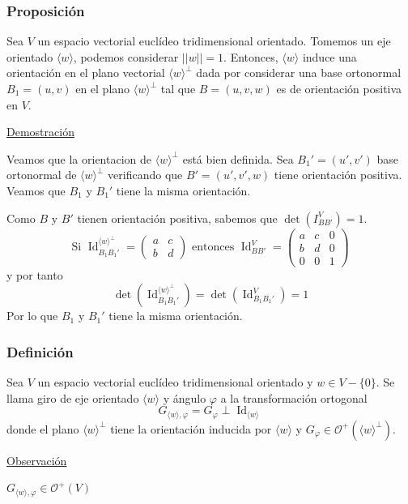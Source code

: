 \documentclass[12pt, a4paper, ones, notitlepage, openany,titlepage]{article}
\begin{document}
\subsubsection{Proposición}
Sea $V$ un espacio vectorial euclídeo tridimensional orientado. Tomemos un eje orientado $\langle w \rangle$, podemos considerar $||w|| = 1$. Entonces, $\langle w \rangle$ induce una orientación en el plano vectorial $\langle w \rangle^\perp$ dada por considerar una base ortonormal $B_1 = (u,v)$ en el plano $\langle w \rangle^\perp$ tal que $B = (u,v,w)$ es de orientación positiva en $V$.

\noindent\underline{Demostración}

Veamos que la orientacion de $\langle w \rangle^\perp$ está bien definida. Sea $B_1' = (u',v')$ base ortonormal de $\langle w \rangle^\perp$ verificando que $B' = (u',v',w)$ tiene orientación positiva. Veamos que $B_1$ y $B_1'$ tiene la misma orientación.

Como $B$ y $B'$ tienen orientación positiva, sabemos que $\det(I_{BB'}^V) = 1$.
$$
\text{Si }\operatorname{Id}_{B_1 B_1'}^{\langle w \rangle^\perp} = \begin{pmatrix}
	a & c \\
	b & d
\end{pmatrix} \text{ entonces } \operatorname{Id}_{BB'}^V = \begin{pmatrix}
	a & c & 0 \\
	b & d & 0 \\
	0 & 0 & 1
\end{pmatrix}
$$
y por tanto
$$
\operatorname{det}\left(\operatorname{Id}_{B_1 B_1'}^{\langle w \rangle^\perp}\right) = \operatorname{det}\left(\operatorname{Id}_{B_1 B_1'}^V\right) = 1
$$ 
Por lo que $B_1$ y $B_1'$ tiene la misma orientación.

\subsubsection{Definición}
Sea $V$ un espacio vectorial euclídeo tridimensional orientado y $w \in V - \{0\}$. Se llama giro de eje orientado $\langle w \rangle$ y ángulo $\varphi$ a la transformación ortogonal
$$
G_{\langle w \rangle, \varphi} = G_\varphi \perp \operatorname{Id}_{\langle w \rangle}
$$
donde el plano $\langle w \rangle^\perp$ tiene la orientación inducida por $\langle w \rangle$ y $G_\varphi \in \mathcal{O}^+ (\langle w \rangle^\perp)$.

\noindent\underline{Observación}

$G_{\langle w \rangle, \varphi} \in \mathcal{O}^+(V)$
\end{document}
